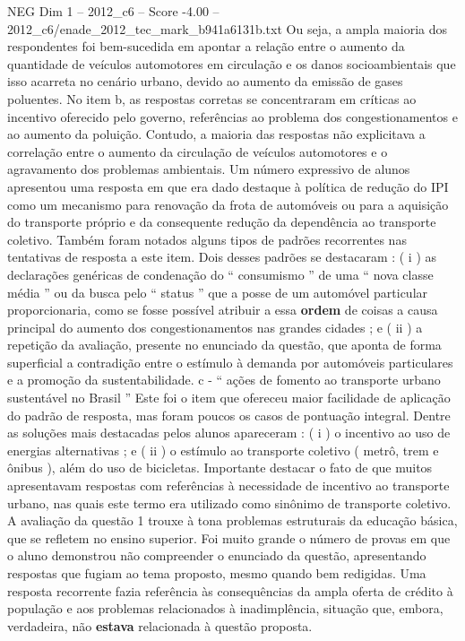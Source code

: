 \begin{textsample}{NEG Dim 1 – 2012\_c6 – Score -4.00 – 2012\_c6/enade\_2012\_tec\_mark\_b941a6131b.txt}
Ou seja, a ampla maioria dos respondentes foi bem-sucedida em apontar a relação entre o aumento da quantidade de veículos automotores em circulação e os danos socioambientais que isso acarreta no cenário urbano, devido ao aumento da emissão de gases poluentes.
No item b, as respostas corretas se concentraram em críticas ao incentivo oferecido pelo governo, referências ao problema dos congestionamentos e ao aumento da poluição.
Contudo, a maioria das respostas não explicitava a correlação entre o aumento da circulação de veículos automotores e o agravamento dos problemas ambientais.
Um número expressivo de alunos apresentou uma resposta em que era dado destaque à política de redução do IPI como um mecanismo para renovação da frota de automóveis ou para a aquisição do transporte próprio e da consequente redução da dependência ao transporte coletivo.
Também foram notados alguns tipos de padrões recorrentes nas tentativas de resposta a este item.
Dois desses padrões se destacaram : ( i ) as declarações genéricas de condenação do “ consumismo ” de uma “ nova classe média ” ou da busca pelo “ status ” que a posse de um automóvel particular proporcionaria, como se fosse possível atribuir a essa \textbf{ordem} de coisas a causa principal do aumento dos congestionamentos nas grandes cidades ; e ( ii ) a repetição da avaliação, presente no enunciado da questão, que aponta de forma superficial a contradição entre o estímulo à demanda por automóveis particulares e a promoção da sustentabilidade. c - “ ações de fomento ao transporte urbano sustentável no Brasil ” Este foi o item que ofereceu maior facilidade de aplicação do padrão de resposta, mas foram poucos os casos de pontuação integral.
Dentre as soluções mais destacadas pelos alunos apareceram : ( i ) o incentivo ao uso de energias alternativas ; e ( ii ) o estímulo ao transporte coletivo ( metrô, trem e ônibus ), além do uso de bicicletas.
Importante destacar o fato de que muitos apresentavam respostas com referências à necessidade de incentivo ao transporte urbano, nas quais este termo era utilizado como sinônimo de transporte coletivo.
A avaliação da questão 1 trouxe à tona problemas estruturais da educação básica, que se refletem no ensino superior.
Foi muito grande o número de provas em que o aluno demonstrou não compreender o enunciado da questão, apresentando respostas que fugiam ao tema proposto, mesmo quando bem redigidas.
Uma resposta recorrente fazia referência às consequências da ampla oferta de crédito à população e aos problemas relacionados à inadimplência, situação que, embora, verdadeira, não \textbf{estava} relacionada à questão proposta.

\end{textsample}
